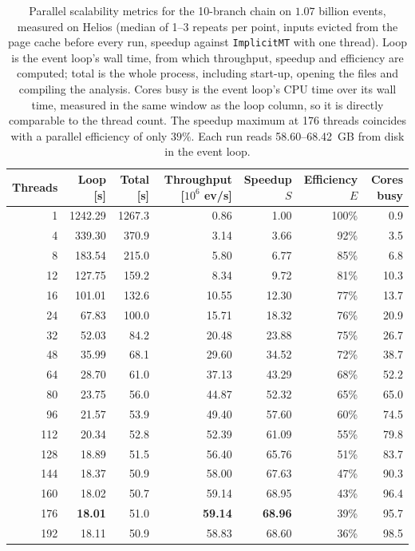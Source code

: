 \begin{table}[htbp]
\centering
\caption{Parallel scalability metrics for the 10-branch chain on $1.07$ billion events, measured on Helios (median of 1--3 repeats per point, inputs evicted from the page cache before every run, speedup against \texttt{ImplicitMT} with one thread). Loop is the event loop's wall time, from which throughput, speedup and efficiency are computed; total is the whole process, including start-up, opening the files and compiling the analysis. Cores busy is the event loop's CPU time over its wall time, measured in the same window as the loop column, so it is directly comparable to the thread count. The speedup maximum at 176 threads coincides with a parallel efficiency of only $39\%$. Each run reads 58.60--68.42~GB from disk in the event loop.}
\label{tab:scalability-chain11}
\setlength{\tabcolsep}{5pt}
\begin{tabular}{rrrrrrr}
\toprule
Threads & Loop [s] & Total [s] & Throughput [$10^6$ ev/s] & Speedup $S$ & Efficiency $E$ & Cores busy \\
\midrule
 1 & 1242.29 & 1267.3 & 0.86 & 1.00 & 100\% & 0.9 \\
 4 & 339.30 & 370.9 & 3.14 & 3.66 & 92\% & 3.5 \\
 8 & 183.54 & 215.0 & 5.80 & 6.77 & 85\% & 6.8 \\
12 & 127.75 & 159.2 & 8.34 & 9.72 & 81\% & 10.3 \\
16 & 101.01 & 132.6 & 10.55 & 12.30 & 77\% & 13.7 \\
24 & 67.83 & 100.0 & 15.71 & 18.32 & 76\% & 20.9 \\
32 & 52.03 & 84.2 & 20.48 & 23.88 & 75\% & 26.7 \\
48 & 35.99 & 68.1 & 29.60 & 34.52 & 72\% & 38.7 \\
64 & 28.70 & 61.0 & 37.13 & 43.29 & 68\% & 52.2 \\
80 & 23.75 & 56.0 & 44.87 & 52.32 & 65\% & 65.0 \\
96 & 21.57 & 53.9 & 49.40 & 57.60 & 60\% & 74.5 \\
112 & 20.34 & 52.8 & 52.39 & 61.09 & 55\% & 79.8 \\
128 & 18.89 & 51.5 & 56.40 & 65.76 & 51\% & 83.7 \\
144 & 18.37 & 50.9 & 58.00 & 67.63 & 47\% & 90.3 \\
160 & 18.02 & 50.7 & 59.14 & 68.95 & 43\% & 96.4 \\
176 & \textbf{18.01} & 51.0 & \textbf{59.14} & \textbf{68.96} & 39\% & 95.7 \\
192 & 18.11 & 50.9 & 58.83 & 68.60 & 36\% & 98.5 \\
\bottomrule
\end{tabular}
\end{table}

